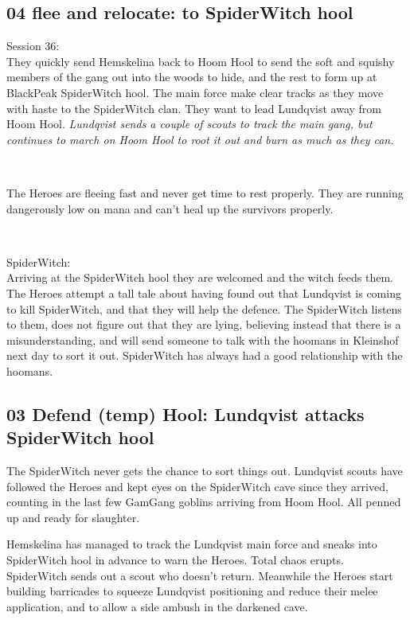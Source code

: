\subsection*{04 flee and relocate: to SpiderWitch hool}

\forceindent Session 36:\\                                              %
They quickly send Hemskelina back to Hoom Hool to send the soft and squishy members of the gang out into the woods to hide, and the rest to form up at BlackPeak SpiderWitch hool. The main force make clear tracks as they move with haste to the SpiderWitch clan. They want to lead Lundqvist away from Hoom Hool.
\emph{Lundqvist sends a couple of scouts to track the main gang, but continues to march on Hoom Hool to root it out and burn as much as they can.}

\

The Heroes are fleeing fast and never get time to rest properly. They are running dangerously low on mana and can't heal up the survivors properly.

\

SpiderWitch:\\
Arriving at the SpiderWitch hool they are welcomed and the witch feeds them. The Heroes attempt a tall tale about having found out that Lundqvist is coming to kill SpiderWitch, and that they will help the defence. The SpiderWitch listens to them, does not figure out that they are lying, believing instead that there is a misunderstanding, and will send someone to talk with the hoomans in Kleinshof next day to sort it out. SpiderWitch has always had a good relationship with the hoomans.


\subsection*{03 Defend (temp) Hool: Lundqvist attacks SpiderWitch hool}

The SpiderWitch never gets the chance to sort things out. Lundqvist scouts have followed the Heroes and kept eyes on the SpiderWitch cave since they arrived, counting in the last few GamGang goblins arriving from Hoom Hool. All penned up and ready for slaughter.

Hemskelina has managed to track the Lundqvist main force and sneaks into SpiderWitch hool in advance to warn the Heroes. Total chaos erupts. SpiderWitch sends out a scout who doesn't return. Meanwhile the Heroes start building barricades to squeeze Lundqvist positioning and reduce their melee application, and to allow a side ambush in the darkened cave.

